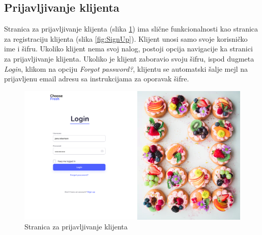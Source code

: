 \subsection{Prijavljivanje klijenta}

Stranica za prijavljivanje klijenta (slika \ref{fig:Login}) ima slične funkcionalnosti kao stranica za registraciju klijenta (slika \ref{fig:SignUp}). Klijent unosi samo svoje korisničko ime i šifru. Ukoliko klijent nema svoj nalog, postoji opcija navigacije ka stranici za prijavljivanje klijenta. Ukoliko je klijent zaboravio svoju šifru, ispod dugmeta \textit{Login}, klikom na opciju \textit{Forgot password?}, klijentu se automatski šalje mejl na prijavljenu email adresu sa instrukcijama za oporavak šifre. 

\begin{figure}[H]
	\begin{center}
		\includegraphics[width=\textwidth]{UI/Login.jpg}
    		\caption{Stranica za prijavljivanje klijenta}
    \label{fig:Login}
    \end{center}
\end{figure}
